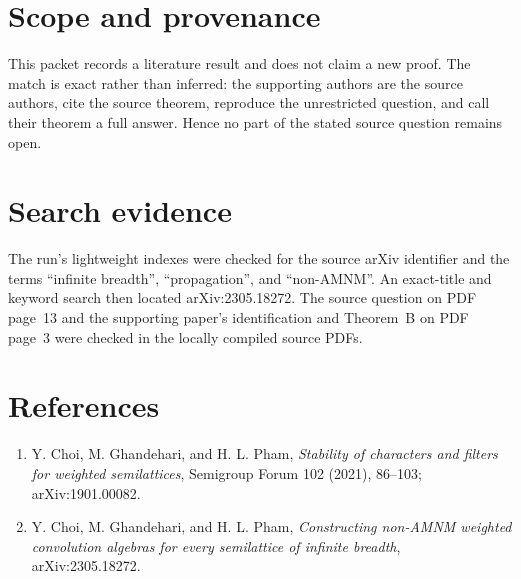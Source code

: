 \documentclass[11pt]{article}
\begin{document}
\section*{Scope and provenance}

This packet records a literature result and does not claim a new proof.
The match is exact rather than inferred: the supporting authors are the
source authors, cite the source theorem, reproduce the unrestricted question,
and call their theorem a full answer.  Hence no part of the stated source
question remains open.

\section*{Search evidence}

The run's lightweight indexes were checked for the source arXiv identifier
and the terms ``infinite breadth'', ``propagation'', and ``non-AMNM''.
An exact-title and keyword search then located arXiv:2305.18272.  The source
question on PDF page~13 and the supporting paper's identification and
Theorem~B on PDF page~3 were checked in the locally compiled source PDFs.

\section*{References}

\begin{enumerate}
\item Y. Choi, M. Ghandehari, and H. L. Pham,
\emph{Stability of characters and filters for weighted semilattices},
Semigroup Forum 102 (2021), 86--103; arXiv:1901.00082.

\item Y. Choi, M. Ghandehari, and H. L. Pham,
\emph{Constructing non-AMNM weighted convolution algebras for every
semilattice of infinite breadth}, arXiv:2305.18272.
\end{enumerate}
\end{document}
